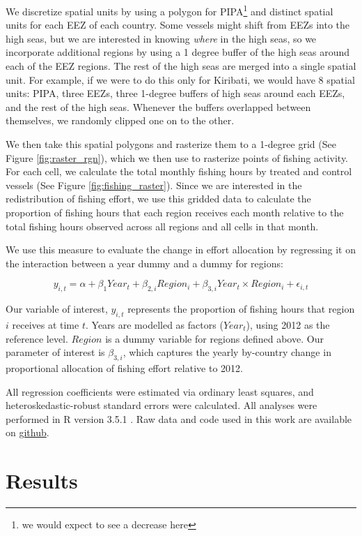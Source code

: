 \documentclass[11pt,]{article}
\let\rmarkdownfootnote\footnote%
\def\footnote{\protect\rmarkdownfootnote}
\begin{document}
We discretize spatial units by using a polygon for
PIPA\footnote{we would expect to see a decrease here} and distinct
spatial units for each EEZ of each country. Some vessels might shift
from EEZs into the high seas, but we are interested in knowing
\emph{where} in the high seas, so we incorporate additional regions by
using a 1 degree buffer of the high seas around each of the EEZ regions.
The rest of the high seas are merged into a single spatial unit. For
example, if we were to do this only for Kiribati, we would have 8
spatial units: PIPA, three EEZs, three 1-degree buffers of high seas
around each EEZs, and the rest of the high seas. Whenever the buffers
overlapped between themselves, we randomly clipped one on to the other.

We then take this spatial polygons and rasterize them to a 1-degree grid
(See Figure \ref{fig:raster_rgn}), which we then use to rasterize points
of fishing activity. For each cell, we calculate the total monthly
fishing hours by treated and control vessels (See Figure
\ref{fig:fishing_raster}). Since we are interested in the redistribution
of fishing effort, we use this gridded data to calculate the proportion
of fishing hours that each region receives each month relative to the
total fishing hours observed across all regions and all cells in that
month.

We use this measure to evaluate the change in effort allocation by
regressing it on the interaction between a year dummy and a dummy for
regions:

\[
y_{i,t} = \alpha + \beta_1Year_t + \beta_{2,i}Region_i + \beta_{3,i}Year_t \times Region_i+ \epsilon_{i,t}
\]

Our variable of interest, \(y_{i,t}\) represents the proportion of
fishing hours that region \(i\) receives at time \(t\). Years are
modelled as factors (\(Year_t\)), using 2012 as the reference level.
\(Region\) is a dummy variable for regions defined above. Our parameter
of interest is \(\beta_{3,i}\), which captures the yearly by-country
change in proportional allocation of fishing effort relative to 2012.

All regression coefficients were estimated via ordinary least squares,
and heteroskedastic-robust standard errors were calculated. All analyses
were performed in R version 3.5.1 \citep{rcore_2018}. Raw data and code
used in this work are available on
\href{https://github.com/jcvdav/MPA_displacement}{github}.

\clearpage

\hypertarget{results}{%
\section{Results}\label{results}}
\end{document}
